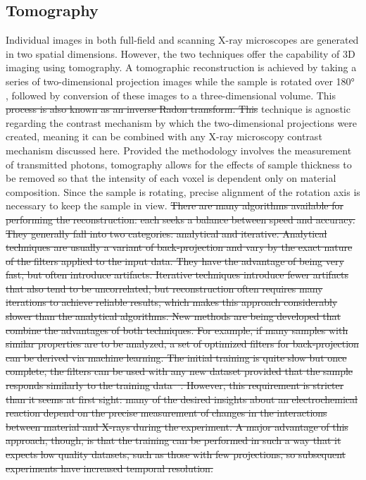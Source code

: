 \documentclass[journal=cmatex,manuscript=perspective]{achemso}
\providecommand{\DIFaddtex}[1]{{\protect\color{blue}\uwave{#1}}} %
\providecommand{\DIFdeltex}[1]{{\protect\color{red}\sout{#1}}}                      %
\providecommand{\DIFaddbegin}{} %
\providecommand{\DIFaddend}{} %
\providecommand{\DIFdelbegin}{} %
\providecommand{\DIFdelend}{} %
\providecommand{\DIFadd}[1]{\texorpdfstring{\DIFaddtex{#1}}{#1}} %
\providecommand{\DIFdel}[1]{\texorpdfstring{\DIFdeltex{#1}}{}} %
\begin{document}
\subsection{Tomography}

Individual images in both full-field and scanning X-ray microscopes
are generated in two spatial dimensions. However, the two techniques
offer the capability of 3D imaging using tomography. A tomographic
reconstruction is achieved by taking a series of two-dimensional
projection images while the sample is rotated over \ang{180}
\DIFaddbegin \DIFadd{(ideally)}\DIFaddend , followed by conversion of these images to a
three-dimensional volume. This \DIFdelbegin \DIFdel{process is also known as an inverse Radon transform. This }\DIFdelend technique is agnostic regarding the
contrast mechanism by which the two-dimensional projections were
created, meaning it can be combined with any X-ray microscopy contrast
mechanism discussed here. Provided the methodology involves the
measurement of transmitted photons, tomography allows for the effects
of sample thickness to be removed so that the intensity of each voxel
is dependent only on material composition. Since the sample is
rotating, precise alignment of the rotation axis is necessary to keep
the sample in view.
\DIFdelbegin \DIFdel{There are many algorithms available for
performing the reconstruction: each seeks a balance between speed and
accuracy. They generally fall into two categories: analytical and
iterative. Analytical techniques are usually a variant of
back-projection and vary by the exact nature of the filters applied to
the input data. They have the advantage of being very fast, but often
introduce artifacts. Iterative techniques introduce fewer artifacts
that also tend to be uncorrelated, but reconstruction often requires
many iterations to achieve reliable results, which makes this approach
considerably slower than the analytical algorithms. New methods are
being developed that combine the advantages of both techniques. For
example, if many samples with similar properties are to be analyzed, a
set of optimized filters for back-projection can be derived via
machine learning. The initial training is quite slow but once
complete, the filters can be used with any new dataset provided that
the sample responds similarly to the training
data\mbox{%
\cite{pelt2013}}%
. However, this requirement is stricter than it
seems at first sight: many of the desired insights about an
electrochemical reaction depend on the precise measurement of changes
in the interactions between material and X-rays during the
experiment. A major advantage of this approach, though, is that the
training can be performed in such a way that it expects low quality
datasets, such as those with few projections, so subsequent
experiments have increased temporal resolution.
}\DIFdelend 
\end{document}
